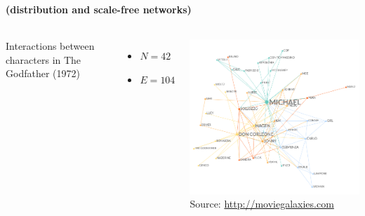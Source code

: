 \documentclass[8pt]{beamer}
\begin{document}
\begin{frame}[fragile]
\frametitle{\insertsection}
\framesubtitle{\insertsubsection \hspace{0.05cm} (distribution and scale-free networks)}

\begin{columns}[c]

\begin{minipage}[c][.5\textheight][c]{\linewidth}


Interactions between characters in The Godfather (1972) 
\begin{itemize}
\item $N = 42$
\item $E = 104$
\end{itemize}

\medskip
\medskip



\end{minipage}	   


\begin{minipage}[c][.5\textheight][c]{\linewidth}
\centering
\includegraphics[width = \textwidth]{gf1}\\
\tiny Source: \url{http://moviegalaxies.com}
\end{minipage}

\end{columns}

\end{frame}
  
\end{document}
